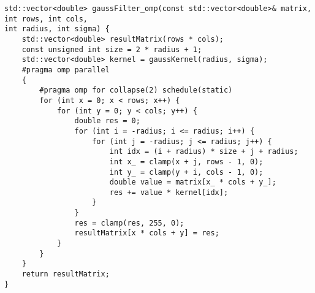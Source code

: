 \documentclass{report}
\begin{document}
\begin{lstlisting}
std::vector<double> gaussFilter_omp(const std::vector<double>& matrix, int rows, int cols,
int radius, int sigma) {
	std::vector<double> resultMatrix(rows * cols);
	const unsigned int size = 2 * radius + 1;
	std::vector<double> kernel = gaussKernel(radius, sigma);
	#pragma omp parallel
	{
		#pragma omp for collapse(2) schedule(static)
		for (int x = 0; x < rows; x++) {
			for (int y = 0; y < cols; y++) {
				double res = 0;
				for (int i = -radius; i <= radius; i++) {
					for (int j = -radius; j <= radius; j++) {
						int idx = (i + radius) * size + j + radius;
						int x_ = clamp(x + j, rows - 1, 0);
						int y_ = clamp(y + i, cols - 1, 0);
						double value = matrix[x_ * cols + y_];
						res += value * kernel[idx];
					}
				}
				res = clamp(res, 255, 0);
				resultMatrix[x * cols + y] = res;
			}
		}
	}
	return resultMatrix;
}


\end{lstlisting}
\end{document}
